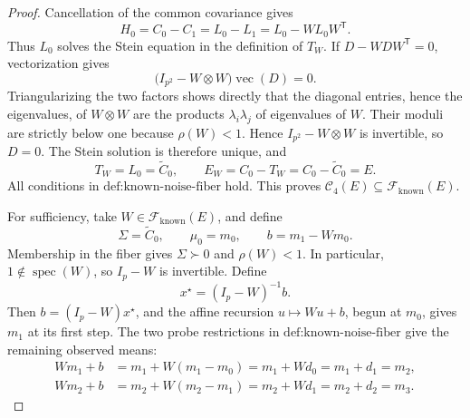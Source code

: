 \documentclass{article}
\begin{document}
\begin{proof}
Cancellation of the common covariance gives
\[
 H_0=C_0-C_1=L_0-L_1=L_0-WL_0W^{\mathsf T}.
\]
Thus \(L_0\) solves the Stein equation in the definition of \(T_W\).  If \(D-WDW^{\mathsf T}=0\), vectorization gives
\[
 \bigl(I_{p^2}-W\otimes W\bigr)\operatorname{vec}(D)=0.
\]
Triangularizing the two factors shows directly that the diagonal entries, hence the eigenvalues, of \(W\otimes W\) are the products \(\lambda_i\lambda_j\) of eigenvalues of \(W\).  Their moduli are strictly below one because \(\rho(W)<1\).  Hence \(I_{p^2}-W\otimes W\) is invertible, so \(D=0\).  The Stein solution is therefore unique, and
\[
 T_W=L_0=\widetilde C_0,
 \qquad
 E_W=C_0-T_W=C_0-\widetilde C_0=E.
\]
All conditions in \(\text{def:known-noise-fiber}\) hold.  This proves \(\mathcal C_4(E)\subseteq\mathcal F_{\mathrm{known}}(E)\).

For sufficiency, take \(W\in\mathcal F_{\mathrm{known}}(E)\), and define
\[
 \Sigma=\widetilde C_0,
 \qquad
 \mu_0=m_0,
 \qquad
 b=m_1-Wm_0.
\]
Membership in the fiber gives \(\Sigma\succ0\) and \(\rho(W)<1\).  In particular, \(1\notin\operatorname{spec}(W)\), so \(I_p-W\) is invertible.  Define
\[
 x^\star=(I_p-W)^{-1}b.
\]
Then \(b=(I_p-W)x^\star\), and the affine recursion \(u\mapsto Wu+b\), begun at \(m_0\), gives \(m_1\) at its first step.  The two probe restrictions in \(\text{def:known-noise-fiber}\) give the remaining observed means:
\[
 \begin{aligned}
 Wm_1+b
 &=m_1+W(m_1-m_0)
 =m_1+Wd_0
 =m_1+d_1=m_2,\\
 Wm_2+b
 &=m_2+W(m_2-m_1)
 =m_2+Wd_1
 =m_2+d_2=m_3.
 \end{aligned}
\]


\end{proof}
\end{document}
